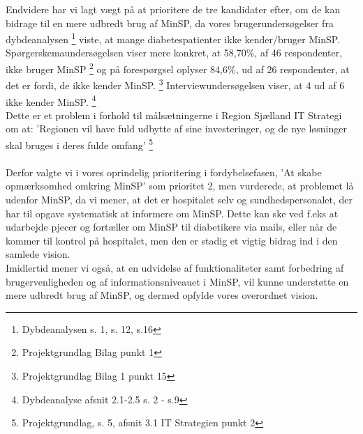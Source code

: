 Endvidere har vi lagt vægt på at prioritere de tre kandidater efter, om de kan bidrage til en mere udbredt brug af MinSP, da vores brugerundersøgelser fra dybdeanalysen \footnote{Dybdeanalysen s. 1, s. 12, s.16} viste, at mange diabetespatienter ikke kender/bruger MinSP. 
Spørgerskemaundersøgelsen viser mere konkret, at 58,70\%, af 46 respondenter, ikke bruger MinSP \footnote{Projektgrundlag Bilag punkt 1} og på forespørgsel oplyser 84,6\%, ud af 26 respondenter, at det er fordi, de ikke kender MinSP. \footnote{Projektgrundlag Bilag 1 punkt 15} Interviewundersøgelsen viser, at 4 ud af 6 ikke kender MinSP. \footnote{Dybdeanalyse afsnit 2.1-2.5 s. 2 - s.9}\\
Dette er et problem i forhold til målsætningerne i Region Sjælland IT Strategi om at: 'Regionen vil have fuld udbytte af sine investeringer, og de nye løsninger skal bruges i deres fulde omfang' \footnote{Projektgrundlag, s. 5, afsnit 3.1 IT Strategien punkt 2}\\
\\
Derfor valgte vi i vores oprindelig prioritering i fordybelsefasen, 'At skabe opmærksomhed omkring MinSP' som prioritet 2, men vurderede, at problemet lå udenfor MinSP, da vi mener, at det er hospitalet selv og sundhedspersonalet, der har til opgave systematisk at informere om MinSP. Dette kan ske ved f.eks at udarbejde pjecer og fortæller om MinSP til diabetikere via mails, eller når de kommer til kontrol på hospitalet, men den er stadig et vigtig bidrag ind i den samlede vision. \\
Imidlertid mener vi også, at en udvidelse af funktionaliteter samt forbedring af brugervenligheden og af informationsniveauet i MinSP, vil kunne understøtte en mere udbredt brug af MinSP, og dermed opfylde vores overordnet vision.
